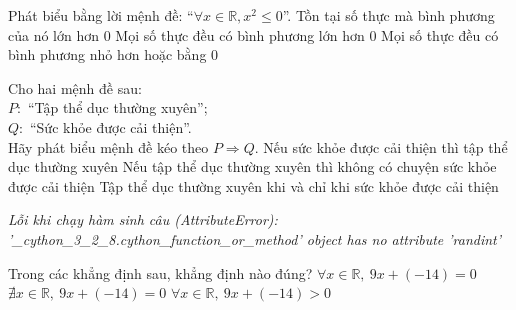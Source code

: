\documentclass[a4paper,12pt]{article}
\begin{document}
\begin{ex}%
Phát biểu bằng lời mệnh đề:
``$\forall x\in \mathbb{R}, x^2 \leq 0$''.
{Tồn tại số thực mà bình phương của nó lớn hơn $0$}
{Mọi số thực đều có bình phương lớn hơn $0$}
{\True Mọi số thực đều có bình phương nhỏ hơn hoặc bằng $0$}


\end{ex}

\begin{ex}%
Cho hai mệnh đề sau:\\
            $P \colon$ ``Tập thể dục thường xuyên'';\\
            $Q \colon$ ``Sức khỏe được cải thiện''.\\
            Hãy phát biểu mệnh đề kéo theo $P \Rightarrow Q$.
{Nếu sức khỏe được cải thiện thì tập thể dục thường xuyên}
{Nếu tập thể dục thường xuyên thì không có chuyện sức khỏe được cải thiện}
{Tập thể dục thường xuyên khi và chỉ khi sức khỏe được cải thiện}


\end{ex}

\begin{center}\end{center}

\begin{center}{\small\textit{Lỗi khi chạy hàm sinh câu (AttributeError): '\_cython\_3\_2\_8.cython\_function\_or\_method' object has no attribute 'randint'}}\end{center}

\begin{ex}%
Trong các khẳng định sau, khẳng định nào đúng?
{$\forall x\in\mathbb R,\ 9x+(-14)=0$}
{$\nexists x\in\mathbb R,\ 9x+(-14)=0$}
{$\forall x\in\mathbb R,\ 9x+(-14)>0$}


\end{ex}

\begin{center}\end{center}
\end{document}
